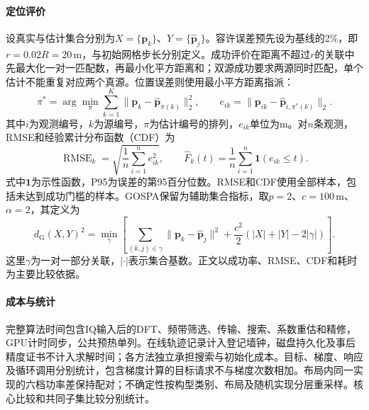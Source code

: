 \paragraph{定位评价}
设真实与估计集合分别为$X=\{\bm p_k\}$、$Y=\{\widehat{\bm p}_j\}$。容许误差预先设为基线的2\%，即$r=0.02R=20$\,m，与初始网格步长分别定义。成功评价在距离不超过$r$的关联中先最大化一对一匹配数，再最小化平方距离和；双源成功要求两源同时匹配，单个估计不能重复对应两个真源。位置误差则使用最小平方距离指派\cite{Kuhn1955}：
\begin{equation}
 \pi^*=\arg\min_{\pi}\sum_{k=1}^{K}\|\bm p_k-\widehat{\bm p}_{\pi(k)}\|_2^2,
 \qquad e_{ik}=\|\bm p_{ik}-\widehat{\bm p}_{i,\pi^*(k)}\|_2 .\label{eq:assignment}
\end{equation}
其中$i$为观测编号，$k$为源编号，$\pi$为估计编号的排列，$e_{ik}$单位为m。对$n$条观测，RMSE和经验累计分布函数（CDF）为
\begin{equation}
 \operatorname{RMSE}_k=\sqrt{\frac1n\sum_{i=1}^{n}e_{ik}^2},\qquad
 \widehat F_k(t)=\frac1n\sum_{i=1}^{n}\mathbf 1(e_{ik}\le t).\label{eq:rmseCDF}
\end{equation}
式中$\mathbf 1$为示性函数，P95为误差的第95百分位数。RMSE和CDF使用全部样本，包括未达到成功门槛的样本。GOSPA\cite{Rahmathullah2017}保留为辅助集合指标，取$p=2$、$c=100$\,m、$\alpha=2$，其定义为
\begin{equation}
 d_{\mathrm G}(X,Y)^2=\min_{\gamma}\left[
 \sum_{(k,j)\in\gamma}\|\bm p_k-\widehat{\bm p}_j\|^2
 +\frac{c^2}{2}\left(|X|+|Y|-2|\gamma|\right)\right].\label{eq:gospa}
\end{equation}
这里$\gamma$为一对一部分关联，$|\cdot|$表示集合基数。正文以成功率、RMSE、CDF和耗时为主要比较依据。

\paragraph{成本与统计}
完整算法时间包含IQ输入后的DFT、频带筛选、传输、搜索、系数重估和精修，GPU计时同步，公共预热单列。在线轨迹记录计入登记墙钟，磁盘持久化及事后精度证书不计入求解时间；各方法独立承担搜索与初始化成本。目标、梯度、响应及循环调用分别统计，包含梯度计算的目标请求不与梯度次数相加。布局内同一实现的六档功率差保持配对；不确定性按构型类别、布局及随机实现分层重采样。核心比较和共同子集比较分别统计。

